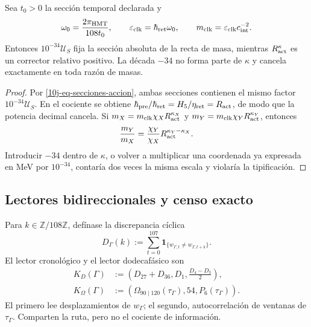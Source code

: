 \begin{proposition}
\label{10j-prop-escala-corrector}
Sea \(t_0>0\) la sección temporal declarada y
\begin{equation}
 \omega_0=\frac{2\pi_{\rm HMT}}{108t_0},
 \qquad \varepsilon_{\rm clk}=\hbar_{\rm ret}\omega_0,
 \qquad m_{\rm clk}=\varepsilon_{\rm clk}c_{\rm int}^{-2}.
 \label{10j-eq-reloj-masa}
\end{equation}
Entonces \(10^{-34}\mathcal U_S\) fija la sección absoluta de la recta de
masa, mientras \(R_{\rm act}^{\kappa}\) es un corrector relativo positivo.
La década \(-34\) no forma parte de \(\kappa\) y cancela exactamente en toda
razón de masas.
\end{proposition}

\begin{proof}
Por \eqref{10j-eq-secciones-accion}, ambas secciones contienen el mismo
factor \(10^{-34}\mathcal U_S\). En el cociente se obtiene
\(\hbar_{\rm pre}/\hbar_{\rm ret}=H_5/\eta_{\rm ret}=R_{\rm act}\), de modo
que la potencia decimal cancela. Si
\(m_X=m_{\rm clk}\chi_XR_{\rm act}^{\kappa_X}\) y
\(m_Y=m_{\rm clk}\chi_YR_{\rm act}^{\kappa_Y}\), entonces
\[
 \frac{m_Y}{m_X}
 =\frac{\chi_Y}{\chi_X}
  R_{\rm act}^{\kappa_Y-\kappa_X}.
\]
Introducir \(-34\) dentro de \(\kappa\), o volver a multiplicar una
coordenada ya expresada en MeV por \(10^{-34}\), contaría dos veces la misma
escala y violaría la tipificación.
\end{proof}

\subsection{Lectores bidireccionales y censo exacto}

Para \(k\in\mathbb Z/108\mathbb Z\), defínase la discrepancia cíclica
\begin{equation}
 D_\Gamma(k):=
 \sum_{t=0}^{107}
 \mathbf1_{\{w_{\Gamma,t}\ne w_{\Gamma,t+k}\}}.
 \label{10j-eq-discrepancia}
\end{equation}
El lector cronológico y el lector dodecafásico son
\begin{align}
 K_D(\Gamma)
 &:=\left(D_{27}+D_{36},D_1,\frac{D_4-D_3}{2}\right),
 \label{10j-eq-kd}\\
 K_\Omega(\Gamma)
 &:=(\Omega_{90\mid120}(\tau_\Gamma),54,P_6(\tau_\Gamma)).
 \label{10j-eq-komega}
\end{align}
El primero lee desplazamientos de \(w_\Gamma\); el segundo, autocorrelación
de ventanas de \(\tau_\Gamma\). Comparten la ruta, pero no el cociente de
información.

